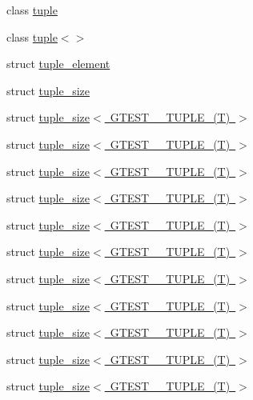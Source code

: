 \begin{DoxyCompactItemize}
\item 
class \mbox{\hyperlink{classstd_1_1tr1_1_1tuple}{tuple}}
\item 
class \mbox{\hyperlink{classstd_1_1tr1_1_1tuple_3_4}{tuple$<$$>$}}
\item 
struct \mbox{\hyperlink{structstd_1_1tr1_1_1tuple__element}{tuple\+\_\+element}}
\item 
struct \mbox{\hyperlink{structstd_1_1tr1_1_1tuple__size}{tuple\+\_\+size}}
\item 
struct \mbox{\hyperlink{structstd_1_1tr1_1_1tuple__size_3_01GTEST__0__TUPLE___07T_08_01_4}{tuple\+\_\+size$<$ G\+T\+E\+S\+T\+\_\+\_\+\+T\+U\+P\+L\+E\+\_\+(\+T) $>$}}
\item 
struct \mbox{\hyperlink{structstd_1_1tr1_1_1tuple__size_3_01GTEST__10__TUPLE___07T_08_01_4}{tuple\+\_\+size$<$ G\+T\+E\+S\+T\+\_\+\_\+\+T\+U\+P\+L\+E\+\_\+(\+T) $>$}}
\item 
struct \mbox{\hyperlink{structstd_1_1tr1_1_1tuple__size_3_01GTEST__1__TUPLE___07T_08_01_4}{tuple\+\_\+size$<$ G\+T\+E\+S\+T\+\_\+\_\+\+T\+U\+P\+L\+E\+\_\+(\+T) $>$}}
\item 
struct \mbox{\hyperlink{structstd_1_1tr1_1_1tuple__size_3_01GTEST__2__TUPLE___07T_08_01_4}{tuple\+\_\+size$<$ G\+T\+E\+S\+T\+\_\+\_\+\+T\+U\+P\+L\+E\+\_\+(\+T) $>$}}
\item 
struct \mbox{\hyperlink{structstd_1_1tr1_1_1tuple__size_3_01GTEST__3__TUPLE___07T_08_01_4}{tuple\+\_\+size$<$ G\+T\+E\+S\+T\+\_\+\_\+\+T\+U\+P\+L\+E\+\_\+(\+T) $>$}}
\item 
struct \mbox{\hyperlink{structstd_1_1tr1_1_1tuple__size_3_01GTEST__4__TUPLE___07T_08_01_4}{tuple\+\_\+size$<$ G\+T\+E\+S\+T\+\_\+\_\+\+T\+U\+P\+L\+E\+\_\+(\+T) $>$}}
\item 
struct \mbox{\hyperlink{structstd_1_1tr1_1_1tuple__size_3_01GTEST__5__TUPLE___07T_08_01_4}{tuple\+\_\+size$<$ G\+T\+E\+S\+T\+\_\+\_\+\+T\+U\+P\+L\+E\+\_\+(\+T) $>$}}
\item 
struct \mbox{\hyperlink{structstd_1_1tr1_1_1tuple__size_3_01GTEST__6__TUPLE___07T_08_01_4}{tuple\+\_\+size$<$ G\+T\+E\+S\+T\+\_\+\_\+\+T\+U\+P\+L\+E\+\_\+(\+T) $>$}}
\item 
struct \mbox{\hyperlink{structstd_1_1tr1_1_1tuple__size_3_01GTEST__7__TUPLE___07T_08_01_4}{tuple\+\_\+size$<$ G\+T\+E\+S\+T\+\_\+\_\+\+T\+U\+P\+L\+E\+\_\+(\+T) $>$}}
\item 
struct \mbox{\hyperlink{structstd_1_1tr1_1_1tuple__size_3_01GTEST__8__TUPLE___07T_08_01_4}{tuple\+\_\+size$<$ G\+T\+E\+S\+T\+\_\+\_\+\+T\+U\+P\+L\+E\+\_\+(\+T) $>$}}
\item 
struct \mbox{\hyperlink{structstd_1_1tr1_1_1tuple__size_3_01GTEST__9__TUPLE___07T_08_01_4}{tuple\+\_\+size$<$ G\+T\+E\+S\+T\+\_\+\_\+\+T\+U\+P\+L\+E\+\_\+(\+T) $>$}}
\end{DoxyCompactItemize}
